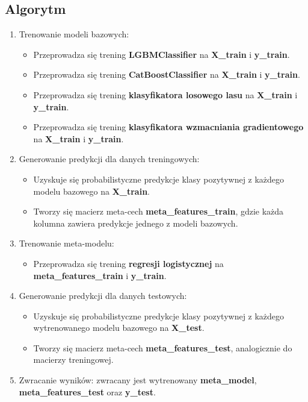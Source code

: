 \subsection{Algorytm}
\begin{enumerate}
	\def\labelenumi{\arabic{enumi}.}
	\item
	      Trenowanie modeli bazowych:
	      \begin{itemize}
		      \item Przeprowadza się trening \textbf{LGBMClassifier} na \textbf{X\_train} i \textbf{y\_train}.
		      \item Przeprowadza się trening \textbf{CatBoostClassifier} na \textbf{X\_train} i \textbf{y\_train}.
		      \item Przeprowadza się trening \textbf{klasyfikatora losowego lasu} na \textbf{X\_train} i \textbf{y\_train}.
		      \item Przeprowadza się trening \textbf{klasyfikatora wzmacniania gradientowego} na \textbf{X\_train} i \textbf{y\_train}.
	      \end{itemize}
	\item
	      Generowanie predykcji dla danych treningowych:
	      \begin{itemize}
		      \item Uzyskuje się probabilistyczne predykcje klasy pozytywnej z każdego modelu bazowego na \textbf{X\_train}.
		      \item Tworzy się macierz meta-cech \textbf{meta\_features\_train}, gdzie każda kolumna zawiera predykcje jednego z modeli bazowych.
	      \end{itemize}
	\item
	      Trenowanie meta-modelu:
	      \begin{itemize}
		      \item Przeprowadza się trening \textbf{regresji logistycznej} na \textbf{meta\_features\_train} i \textbf{y\_train}.
	      \end{itemize}
	\item
	      Generowanie predykcji dla danych testowych:
	      \begin{itemize}
		      \item Uzyskuje się probabilistyczne predykcje klasy pozytywnej z każdego wytrenowanego modelu bazowego na \textbf{X\_test}.
		      \item Tworzy się macierz meta-cech \textbf{meta\_features\_test}, analogicznie do macierzy treningowej.
	      \end{itemize}
	\item
	      Zwracanie wyników: zwracany jest wytrenowany \textbf{meta\_model}, \textbf{meta\_features\_test} oraz \textbf{y\_test}.
\end{enumerate}

